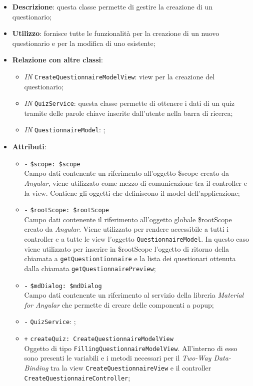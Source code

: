 \begin{itemize}
	\item \textbf{Descrizione}: questa classe permette di gestire la creazione di un questionario;
	\item \textbf{Utilizzo}: fornisce tutte le funzionalità per la creazione di un nuovo questionario e per la modifica di uno esistente;
	\item \textbf{Relazione con altre classi}:
	\begin{itemize}
		\item \textit{IN} \texttt{CreateQuestionnaireModelView}: view per la creazione del questionario; 
		\item \textit{IN} \texttt{QuizService}: questa classe permette di ottenere i dati di un quiz tramite delle parole chiave inserite dall'utente nella barra di ricerca;
		\item \textit{IN} \texttt{QuestionnaireModel}: ;
	\end{itemize}
	\item \textbf{Attributi}:
	\begin{itemize}
		\item \texttt{-} \texttt{\$scope: \$scope} \\
		Campo dati contenente un riferimento all’oggetto \$scope creato da \textit{Angular}, viene utilizzato come mezzo di comunicazione tra il controller e la view. Contiene gli oggetti che definiscono il model dell’applicazione;
		\item \texttt{-} \texttt{\$rootScope: \$rootScope} \\
		Campo dati contenente il riferimento all'oggetto globale \$rootScope creato da \textit{Angular}. Viene utilizzato per rendere accessibile a tutti i controller e a tutte le view l'oggetto \texttt{QuestionnaireModel}. In questo caso viene utilizzato per inserire in \$rootScope l'oggetto di ritorno della chiamata a \texttt{getQuestiontionnaire} e la lista dei questionari ottenuta dalla chiamata \texttt{getQuestionnairePreview};
		\item \texttt{-} \texttt{\$mdDialog: \$mdDialog} \\
		Campo dati contenente un riferimento al servizio della libreria \textit{Material for Angular} che permette di creare delle componenti a popup;
		\item \texttt{-} \texttt{QuizService}: ;
		\item \texttt{+} \texttt{createQuiz: CreateQuestionnaireModelView} \\
		Oggetto di tipo \texttt{FillingQuestionnaireModelView}. All'interno di esso sono presenti le variabili e i metodi necessari per il \textit{Two-Way Data-Binding} tra la view \texttt{CreateQuestionnaireView} e il controller \texttt{CreateQuestionnaireController};

\end{itemize}
\end{itemize}
